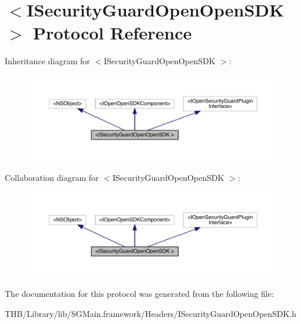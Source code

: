 \hypertarget{protocol_i_security_guard_open_open_s_d_k_01-p}{}\section{$<$I\+Security\+Guard\+Open\+Open\+S\+DK $>$ Protocol Reference}
\label{protocol_i_security_guard_open_open_s_d_k_01-p}


Inheritance diagram for $<$I\+Security\+Guard\+Open\+Open\+S\+DK $>$\+:\nopagebreak
\begin{figure}[H]
\begin{center}
\leavevmode
\includegraphics[width=350pt]{protocol_i_security_guard_open_open_s_d_k_01-p__inherit__graph}
\end{center}
\end{figure}


Collaboration diagram for $<$I\+Security\+Guard\+Open\+Open\+S\+DK $>$\+:\nopagebreak
\begin{figure}[H]
\begin{center}
\leavevmode
\includegraphics[width=350pt]{protocol_i_security_guard_open_open_s_d_k_01-p__coll__graph}
\end{center}
\end{figure}


The documentation for this protocol was generated from the following file\+:\begin{DoxyCompactItemize}
\item 
T\+H\+B/\+Library/lib/\+S\+G\+Main.\+framework/\+Headers/I\+Security\+Guard\+Open\+Open\+S\+D\+K.\+h\end{DoxyCompactItemize}
